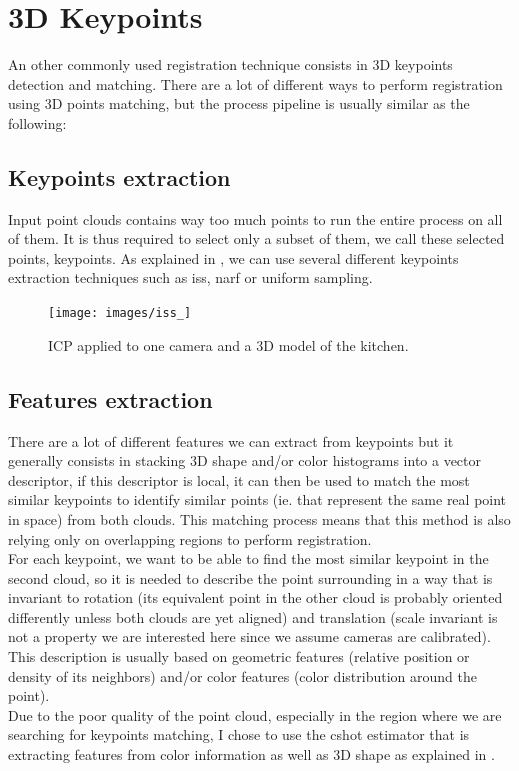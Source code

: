 \section{3D Keypoints}

An other commonly used registration technique consists in 3D keypoints detection and matching. 
There are a lot of different ways to perform registration using 3D points matching, but the process pipeline is usually similar as the following:

\subsection{Keypoints extraction}

    Input point clouds contains way too much points to run the entire process on all of them. It is thus required to select only a subset of them, we call these selected points, keypoints. As explained in \cite{pcl_feat}, we can use several different keypoints extraction techniques such as \acrshort{iss}, \acrshort{narf} or uniform sampling. \\
    
    \begin{figure}[h!]
        \centering
        \texttt{[image: images/iss\_]}
        \caption{ICP applied to one camera and a 3D model of the kitchen.}
        \label{fig:icp_model}
    \end{figure}

\subsection{Features extraction}

    There are a lot of different features we can extract from keypoints but it generally consists in stacking 3D shape and/or color histograms into a vector descriptor, if this descriptor is local, it can then be used to match the most similar keypoints to identify similar points (ie. that represent the same real point in space) from both clouds. This matching process means that this method is also relying only on overlapping regions to perform registration. \\
    For each keypoint, we want to be able to find the most similar keypoint in the second cloud, so it is needed to describe the point surrounding in a way that is invariant to rotation (its equivalent point in the other cloud is probably oriented differently unless both clouds are yet aligned) and translation (scale invariant is not a property we are interested here since we assume cameras are calibrated). This description is usually based on geometric features (relative position or density of its neighbors) and/or color features (color distribution around the point). \\
    Due to the poor quality of the point cloud, especially in the region where we are searching for keypoints matching, I chose to use the \acrshort{cshot} estimator that is extracting features from color information as well as 3D shape as explained in \cite{tombari2011}.
    
